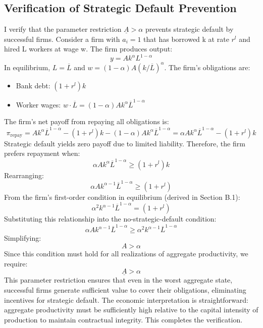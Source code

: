 \documentclass[12pt]{article}
\begin{document}
\subsection{Verification of Strategic Default Prevention}
I verify that the parameter restriction $\underline{A} > \alpha$ prevents strategic default by successful firms. Consider a firm with $a_{i}=1$ that has borrowed k at rate $r^{l}$ and hired L workers at wage w. The firm produces output:
\begin{equation}
y = Ak^{\alpha}L^{1-\alpha}
\end{equation}
In equilibrium, $L=\overline{L}$ and $w=(1-\alpha)A(k/\overline{L})^{\alpha}$. The firm's obligations are:
\begin{itemize}
    \item Bank debt: $(1+r^{l})k$
    \item Worker wages: $w \cdot \overline{L} = (1-\alpha)Ak^{\alpha}\overline{L}^{1-\alpha}$
\end{itemize}
The firm's net payoff from repaying all obligations is:
\begin{equation}
\pi_{\text{repay}} = Ak^{\alpha}\overline{L}^{1-\alpha} - (1+r^{l})k - (1-\alpha)Ak^{\alpha}\overline{L}^{1-\alpha} = \alpha Ak^{\alpha}\overline{L}^{1-\alpha} - (1+r^{l})k
\end{equation}
Strategic default yields zero payoff due to limited liability. Therefore, the firm prefers repayment when:
\begin{equation}
\alpha Ak^{\alpha}\overline{L}^{1-\alpha} \ge (1+r^{l})k
\end{equation}
Rearranging:
\begin{equation}
\alpha Ak^{\alpha-1}\overline{L}^{1-\alpha} \ge (1+r^{l})
\end{equation}
From the firm's first-order condition in equilibrium (derived in Section B.1):
\begin{equation}
\alpha^{2}k^{\alpha-1}\overline{L}^{1-\alpha} = (1+r^{l})
\end{equation}
Substituting this relationship into the no-strategic-default condition:
\begin{equation}
\alpha Ak^{\alpha-1}\overline{L}^{1-\alpha} \ge \alpha^{2}k^{\alpha-1}\overline{L}^{1-\alpha}
\end{equation}
Simplifying:
\begin{equation}
A > \alpha
\end{equation}
Since this condition must hold for all realizations of aggregate productivity, we require:
\begin{equation}
\underline{A} > \alpha
\end{equation}
This parameter restriction ensures that even in the worst aggregate state, successful firms generate sufficient value to cover their obligations, eliminating incentives for strategic default. The economic interpretation is straightforward: aggregate productivity must be sufficiently high relative to the capital intensity of production to maintain contractual integrity. This completes the verification.
\end{document}
